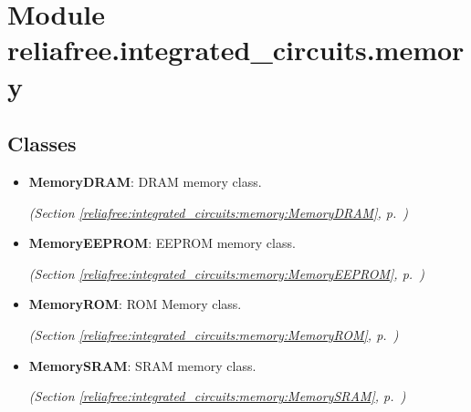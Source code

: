 %
%
%


\section{Module reliafree.integrated\_circuits.memory}

    \label{reliafree:integrated_circuits:memory}


\subsection{Classes}

\begin{itemize}  \setlength{\parskip}{0ex}
  \item \textbf{MemoryDRAM}: DRAM memory class.



  \textit{(Section \ref{reliafree:integrated_circuits:memory:MemoryDRAM}, p.~\pageref{reliafree:integrated_circuits:memory:MemoryDRAM})}

  \item \textbf{MemoryEEPROM}: EEPROM memory class.



  \textit{(Section \ref{reliafree:integrated_circuits:memory:MemoryEEPROM}, p.~\pageref{reliafree:integrated_circuits:memory:MemoryEEPROM})}

  \item \textbf{MemoryROM}: ROM Memory class.



  \textit{(Section \ref{reliafree:integrated_circuits:memory:MemoryROM}, p.~\pageref{reliafree:integrated_circuits:memory:MemoryROM})}

  \item \textbf{MemorySRAM}: SRAM memory class.



  \textit{(Section \ref{reliafree:integrated_circuits:memory:MemorySRAM}, p.~\pageref{reliafree:integrated_circuits:memory:MemorySRAM})}

\end{itemize}


